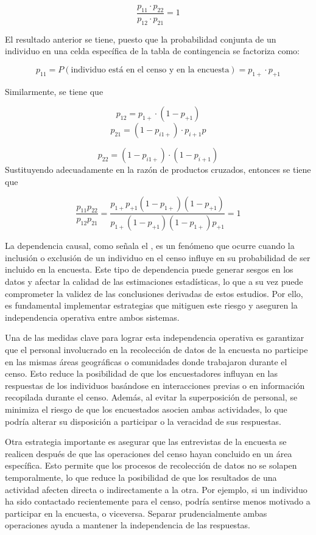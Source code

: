 \documentclass[
  12pt,
]{book}
\begin{document}
\[
\frac{p_{11} \cdot p_{22}}{p_{12} \cdot p_{21}} = 1
\]

El resultado anterior se tiene, puesto que la probabilidad conjunta de un individuo en una celda específica de la tabla de contingencia se factoriza como:

\[
p_{11} = P(\text{individuo está en el censo y en la encuesta}) = p_{1+} \cdot p_{+1}
\]

Similarmente, se tiene que

\[
p_{12} = p_{1+} \cdot (1 - p_{+1})
\]
\[
p_{21} = (1 - p_{i1+})\cdot p_{i+1}  p
\]

\[
p_{22} = (1 - p_{i1+}) \cdot (1 - p_{i+1})
\]
Sustituyendo adecuadamente en la razón de productos cruzados, entonces se tiene que

\[
\frac{p_{11} p_{22}}{p_{12} p_{21}} =
\frac{p_{1+} p_{+1} (1 - p_{1+}) (1 - p_{+1})}
{p_{1+} (1 - p_{+1}) (1 - p_{1+}) p_{+1}} = 1
\]

La dependencia causal, como señala el \citet{USCensusBureau_2022}, es un fenómeno que ocurre cuando la inclusión o exclusión de un individuo en el censo influye en su probabilidad de ser incluido en la encuesta. Este tipo de dependencia puede generar sesgos en los datos y afectar la calidad de las estimaciones estadísticas, lo que a su vez puede comprometer la validez de las conclusiones derivadas de estos estudios. Por ello, es fundamental implementar estrategias que mitiguen este riesgo y aseguren la independencia operativa entre ambos sistemas.

Una de las medidas clave para lograr esta independencia operativa es garantizar que el personal involucrado en la recolección de datos de la encuesta no participe en las mismas áreas geográficas o comunidades donde trabajaron durante el censo. Esto reduce la posibilidad de que los encuestadores influyan en las respuestas de los individuos basándose en interacciones previas o en información recopilada durante el censo. Además, al evitar la superposición de personal, se minimiza el riesgo de que los encuestados asocien ambas actividades, lo que podría alterar su disposición a participar o la veracidad de sus respuestas.

Otra estrategia importante es asegurar que las entrevistas de la encuesta se realicen después de que las operaciones del censo hayan concluido en un área específica. Esto permite que los procesos de recolección de datos no se solapen temporalmente, lo que reduce la posibilidad de que los resultados de una actividad afecten directa o indirectamente a la otra. Por ejemplo, si un individuo ha sido contactado recientemente para el censo, podría sentirse menos motivado a participar en la encuesta, o viceversa. Separar prudencialmente ambas operaciones ayuda a mantener la independencia de las respuestas.
\end{document}
